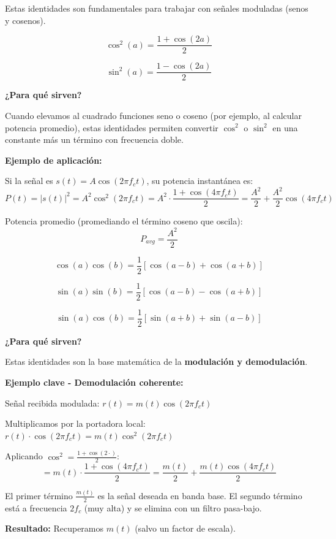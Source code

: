 \documentclass[11pt,a4paper]{article}
\begin{document}
Estas identidades son fundamentales para trabajar con señales moduladas (senos y cosenos).

\begin{tcolorbox}[colback=azulclaro!20,colframe=azuloscuro,title=\textbf{Identidades de potencias}]
$$\boxed{\cos^2(a) = \frac{1 + \cos(2a)}{2}}$$

$$\boxed{\sin^2(a) = \frac{1 - \cos(2a)}{2}}$$

\textbf{¿Para qué sirven?}

Cuando elevamos al cuadrado funciones seno o coseno (por ejemplo, al calcular potencia promedio), estas identidades permiten convertir $\cos^2$ o $\sin^2$ en una constante más un término con frecuencia doble.

\textbf{Ejemplo de aplicación:}

Si la señal es $s(t) = A\cos(2\pi f_c t)$, su potencia instantánea es:
$$P(t) = |s(t)|^2 = A^2\cos^2(2\pi f_c t) = A^2 \cdot \frac{1 + \cos(4\pi f_c t)}{2} = \frac{A^2}{2} + \frac{A^2}{2}\cos(4\pi f_c t)$$

Potencia promedio (promediando el término coseno que oscila):
$$P_{avg} = \frac{A^2}{2}$$
\end{tcolorbox}

\begin{tcolorbox}[colback=azulclaro!20,colframe=azuloscuro,title=\textbf{Productos de senos y cosenos}]
$$\boxed{\cos(a)\cos(b) = \frac{1}{2}[\cos(a-b) + \cos(a+b)]}$$

$$\boxed{\sin(a)\sin(b) = \frac{1}{2}[\cos(a-b) - \cos(a+b)]}$$

$$\boxed{\sin(a)\cos(b) = \frac{1}{2}[\sin(a+b) + \sin(a-b)]}$$

\textbf{¿Para qué sirven?}

Estas identidades son la base matemática de la \textbf{modulación y demodulación}.

\textbf{Ejemplo clave - Demodulación coherente:}

Señal recibida modulada: $r(t) = m(t)\cos(2\pi f_c t)$

Multiplicamos por la portadora local: $r(t) \cdot \cos(2\pi f_c t) = m(t)\cos^2(2\pi f_c t)$

Aplicando $\cos^2 = \frac{1+\cos(2\cdot)}{2}$:
$$= m(t) \cdot \frac{1 + \cos(4\pi f_c t)}{2} = \frac{m(t)}{2} + \frac{m(t)\cos(4\pi f_c t)}{2}$$

El primer término $\frac{m(t)}{2}$ es la señal deseada en banda base. El segundo término está a frecuencia $2f_c$ (muy alta) y se elimina con un filtro pasa-bajo.

\textbf{Resultado:} Recuperamos $m(t)$ (salvo un factor de escala).
\end{tcolorbox}
\end{document}
